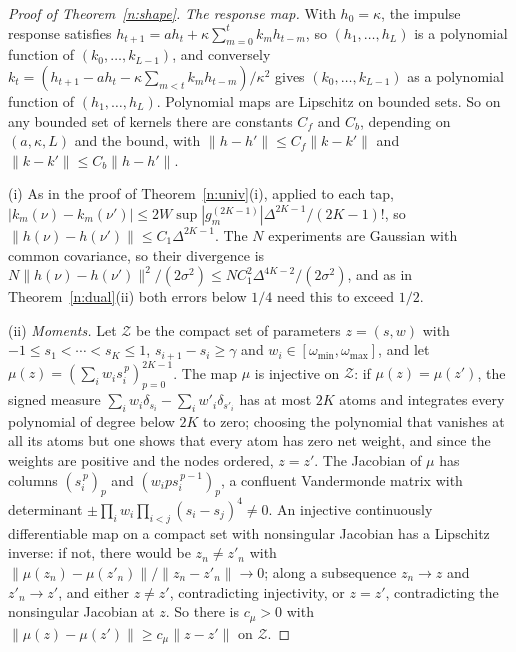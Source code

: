 \begin{proof}[Proof of Theorem~\ref{n:shape}]
\emph{The response map.} With $h_0=\kappa$, the impulse response satisfies $h_{t+1}=ah_t+\kappa\sum_{m=0}^tk_mh_{t-m}$, so $(h_1,\ldots,h_L)$ is a polynomial function of $(k_0,\ldots,k_{L-1})$, and conversely $k_t=(h_{t+1}-ah_t-\kappa\sum_{m<t}k_mh_{t-m})/\kappa^2$ gives $(k_0,\ldots,k_{L-1})$ as a polynomial function of $(h_1,\ldots,h_L)$. Polynomial maps are Lipschitz on bounded sets. So on any bounded set of kernels there are constants $C_f$ and $C_b$, depending on $(a,\kappa,L)$ and the bound, with $\|h-h'\|\le C_f\|k-k'\|$ and $\|k-k'\|\le C_b\|h-h'\|$.

(i) As in the proof of Theorem~\ref{n:univ}(i), applied to each tap, $|k_m(\nu)-k_m(\nu')|\le2W\sup|g_m^{(2K-1)}|\Delta^{2K-1}/(2K-1)!$, so $\|h(\nu)-h(\nu')\|\le C_1\Delta^{2K-1}$. The $N$ experiments are Gaussian with common covariance, so their divergence is $N\|h(\nu)-h(\nu')\|^2/(2\sigma^2)\le NC_1^2\Delta^{4K-2}/(2\sigma^2)$, and as in Theorem~\ref{n:dual}(ii) both errors below $1/4$ need this to exceed $1/2$.

(ii) \emph{Moments.} Let $\mathcal Z$ be the compact set of parameters $z=(s,w)$ with $-1\le s_1<\cdots<s_K\le1$, $s_{i+1}-s_i\ge\gamma$ and $w_i\in[\omega_{\min},\omega_{\max}]$, and let $\mu(z)=(\sum_iw_is_i^{\,p})_{p=0}^{2K-1}$. The map $\mu$ is injective on $\mathcal Z$: if $\mu(z)=\mu(z')$, the signed measure $\sum_iw_i\delta_{s_i}-\sum_iw'_i\delta_{s'_i}$ has at most $2K$ atoms and integrates every polynomial of degree below $2K$ to zero; choosing the polynomial that vanishes at all its atoms but one shows that every atom has zero net weight, and since the weights are positive and the nodes ordered, $z=z'$. The Jacobian of $\mu$ has columns $(s_i^{\,p})_p$ and $(w_ips_i^{\,p-1})_p$, a confluent Vandermonde matrix with determinant $\pm\prod_iw_i\prod_{i<j}(s_i-s_j)^4\ne0$. An injective continuously differentiable map on a compact set with nonsingular Jacobian has a Lipschitz inverse: if not, there would be $z_n\ne z'_n$ with $\|\mu(z_n)-\mu(z'_n)\|/\|z_n-z'_n\|\to0$; along a subsequence $z_n\to z$ and $z'_n\to z'$, and either $z\ne z'$, contradicting injectivity, or $z=z'$, contradicting the nonsingular Jacobian at $z$. So there is $c_\mu>0$ with $\|\mu(z)-\mu(z')\|\ge c_\mu\|z-z'\|$ on $\mathcal Z$.


\end{proof}
